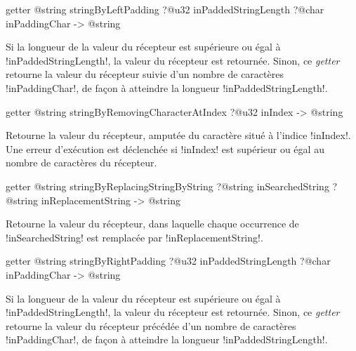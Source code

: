 
\begin{galgas4box}
getter @string stringByLeftPadding
   ?@u32 inPaddedStringLength
   ?@char inPaddingChar -> @string
\end{galgas4box}

Si la longueur de la valeur du récepteur est supérieure ou égal à \ggsq!inPaddedStringLength!, la valeur du récepteur est retournée. Sinon, ce \emph{getter} retourne la valeur du récepteur suivie d'un nombre de caractères \ggsq!inPaddingChar!, de façon à atteindre la longueur \ggsq!inPaddedStringLength!.








\begin{galgas4box}
getter @string stringByRemovingCharacterAtIndex ?@u32 inIndex -> @string
\end{galgas4box}

Retourne la valeur du récepteur, amputée du caractère situé à l'indice \ggsq!inIndex!. Une erreur d'exécution est déclenchée si \ggsq!inIndex! est supérieur ou égal au nombre de caractères du récepteur.








\begin{galgas4box}
getter @string stringByReplacingStringByString
     ?@string inSearchedString
     ?@string inReplacementString  -> @string
\end{galgas4box}

Retourne la valeur du récepteur, dans laquelle chaque occurrence de \ggsq!inSearchedString! est remplacée par \ggsq!inReplacementString!.








\begin{galgas4box}
getter @string stringByRightPadding
   ?@u32 inPaddedStringLength
   ?@char inPaddingChar -> @string
\end{galgas4box}

Si la longueur de la valeur du récepteur est supérieure ou égal à \ggsq!inPaddedStringLength!, la valeur du récepteur est retournée. Sinon, ce \emph{getter} retourne la valeur du récepteur précédée d'un nombre de caractères \ggsq!inPaddingChar!, de façon à atteindre la longueur \ggsq!inPaddedStringLength!.





